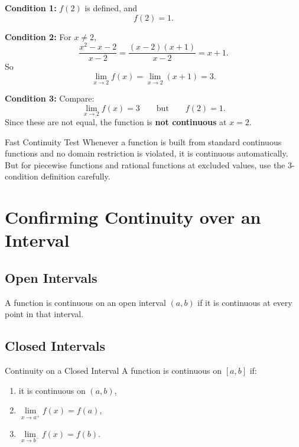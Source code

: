 \documentclass[11pt]{article}
\newcommand{\solution}{\noindent{\textbf{Solution.}}}
\begin{document}
\bigskip

\solution

\textbf{Condition 1:} $f(2)$ is defined, and
\[
f(2)=1.
\]

\textbf{Condition 2:} For $x\neq 2$,
\[
\frac{x^2-x-2}{x-2}
=
\frac{(x-2)(x+1)}{x-2}=x+1.
\]
So
\[
\lim_{x\to 2}f(x)=\lim_{x\to 2}(x+1)=3.
\]

\textbf{Condition 3:} Compare:
\[
\lim_{x\to 2}f(x)=3
\qquad\text{but}\qquad
f(2)=1.
\]
Since these are not equal, the function is \textbf{not continuous} at $x=2$.

\bigskip

\begin{notebox}{Fast Continuity Test}
Whenever a function is built from standard continuous functions and no domain restriction is violated, it is continuous automatically. But for piecewise functions and rational functions at excluded values, use the 3-condition definition carefully.
\end{notebox}

\newpage
\section{Confirming Continuity over an Interval}

\subsection{Open Intervals}

A function is continuous on an open interval $(a,b)$ if it is continuous at every point in that interval.

\subsection{Closed Intervals}

\begin{theorybox}{Continuity on a Closed Interval}
A function is continuous on $[a,b]$ if:
\begin{enumerate}
    \item it is continuous on $(a,b)$,
    \item $\lim\limits_{x\to a^+}f(x)=f(a)$,
    \item $\lim\limits_{x\to b^-}f(x)=f(b)$.
\end{enumerate}
\end{theorybox}
\end{document}
